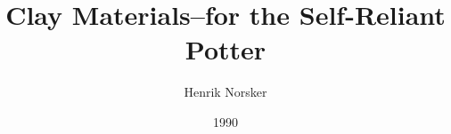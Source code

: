 \documentclass[10pt,a4paper]{book}
\begin{document}
\begin{titlepage}
\title{Clay Materials--for the Self-Reliant Potter}
\date{1990}
\author{Henrik Norsker}
\maketitle
\end{titlepage}
\tableofcontents








\end{document}
